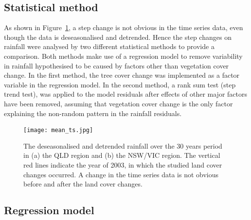\documentclass[draft,linenumbers]{agujournal}
\begin{document}
\begin{article}
\section{Statistical method}

As shown in Figure~\ref{fig:ts_mean}, a step change is not obvious in the time series data, even though the data is deseasonalised and detrended. Hence the step changes on rainfall were analysed by two different statistical methods to provide a comparison. Both methods make use of a regression model to remove variability in rainfall hypothesised to be caused by factors other than vegetation cover change. In the first method, the tree cover change was implemented as a factor variable in the regression model. In the second method, a rank sum test (step trend test), was applied to the model residuals after effects of other major factors have been removed, assuming that vegetation cover change is the only factor explaining the non-random pattern in the rainfall residuals.

\begin{figure}[htp]
  \centering
  \texttt{[image: mean\_ts.jpg]}
  \caption{The deseasonalised and detrended rainfall over the 30 years period in (a) the QLD region and (b) the NSW/VIC region. The vertical red lines indicate the year of 2003, in which the studied land cover changes occurred. A change in the time series data is not obvious before and after the land cover changes.}
  \label{fig:ts_mean}
\end{figure}

\subsection{Regression model}
\label{sec:reg_model}


\end{article}
\end{document}
